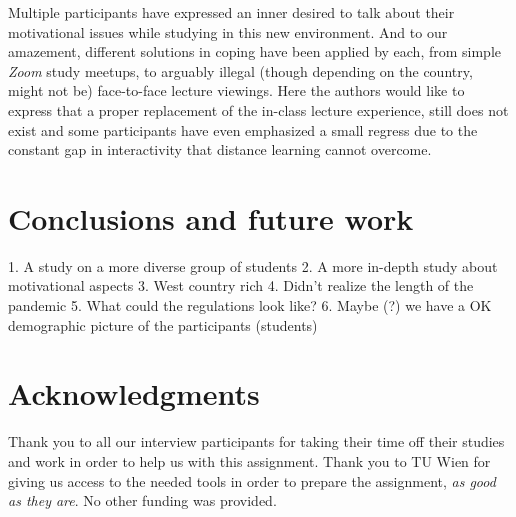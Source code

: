 \documentclass{sigchi}
\begin{document}
Multiple participants have expressed an inner desired to talk about their motivational issues while studying in this new environment. And to our amazement, different solutions in coping have been applied by each, from simple \emph{Zoom} study meetups, to arguably illegal (though depending on the country, might not be) face-to-face lecture viewings. Here the authors would like to express that a proper replacement of the in-class lecture experience, still does not exist and some participants have even emphasized a small regress due to the constant gap in interactivity that distance learning cannot overcome.

\section{Conclusions and future work}

1. A study on a more diverse group of students
2. A more in-depth study about motivational aspects
3. West country rich 
4. Didn’t realize the length of the pandemic
5. What could the regulations look like?
6. Maybe (?) we have a OK demographic picture of the participants (students)



\section{Acknowledgments}
Thank you to all our interview participants for taking their time off their studies and work in order to help us with this assignment. Thank you to TU Wien for giving us access to the needed tools in order to prepare the assignment,  \textit{as good as they are}. No other funding was provided.



\end{document}
